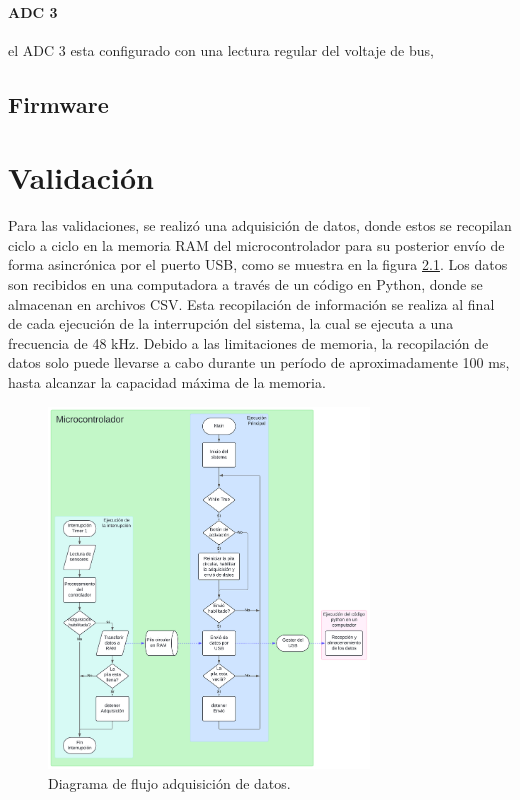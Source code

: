 \documentclass[11pt]{report}
\begin{document}
\subsubsection{ADC 3}
el ADC 3 esta configurado con una lectura regular del voltaje de bus, 

\section{Firmware}

\chapter{Validación}
Para las validaciones, se realizó una adquisición de datos, donde estos se recopilan ciclo a ciclo en la memoria RAM del microcontrolador para su posterior envío de forma asincrónica por el puerto USB, como se muestra en la figura \ref{flujo_debug}. Los datos son recibidos en una computadora a través de un código en Python, donde se almacenan en archivos CSV. Esta recopilación de información se realiza al final de cada ejecución de la interrupción del sistema, la cual se ejecuta a una frecuencia de 48 kHz. Debido a las limitaciones de memoria, la recopilación de datos solo puede llevarse a cabo durante un período de aproximadamente 100 ms, hasta alcanzar la capacidad máxima de la memoria.

\begin{figure}[ht]
	\centering
	\includegraphics[width=0.76\textwidth]{imagenes/Diagramas/Debug USB.png}
	\caption{Diagrama de flujo adquisición de datos.}
	\label{flujo_debug}
\end{figure}
\FloatBarrier
\end{document}
